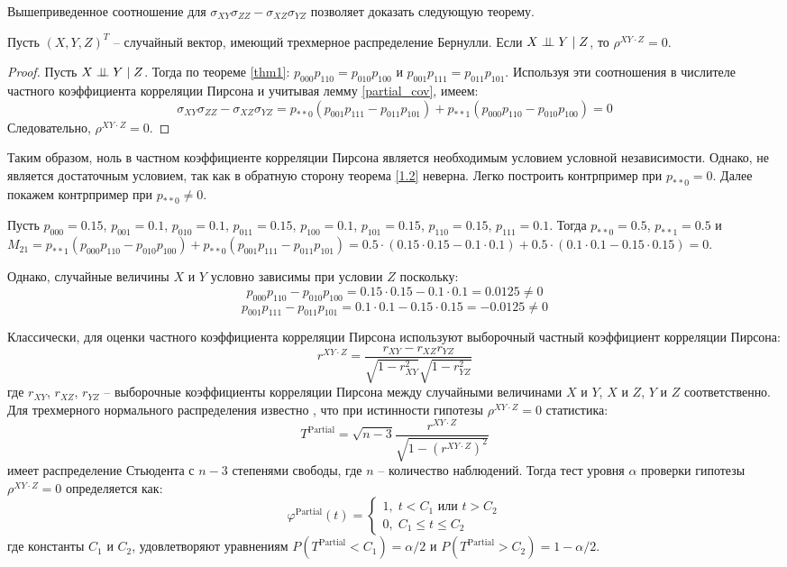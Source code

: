 Вышеприведенное соотношение для $\sigma_{XY} \sigma_{ZZ} - \sigma_{XZ} \sigma_{YZ}$ позволяет доказать следующую теорему.
\begin{theorem}\label{1.2}
    Пусть $(X,Y,Z)^T$ -- случайный вектор, имеющий трехмерное распределение Бернулли.
    Если $X \perp\!\!\!\perp Y \mid Z$, то $\rho^{XY \cdot Z}=0$.
\end{theorem}
\begin{proof}
    Пусть $X \perp\!\!\!\perp Y \mid Z$. Тогда по теореме \ref{thm1}:
    $p_{000}p_{110}=p_{010}p_{100}$ и 
    $p_{001}p_{111}=p_{011}p_{101}$.
    Используя эти соотношения в числителе частного коэффициента корреляции Пирсона и учитывая лемму \ref{partial_cov}, имеем:
    $$
    \sigma_{XY} \sigma_{ZZ} - \sigma_{XZ} \sigma_{YZ}=p_{**0}(p_{001}p_{111}-p_{011}p_{101}) + p_{**1} (p_{000}p_{110}-p_{010}p_{100})= 0
    $$
    Следовательно, $\rho^{XY \cdot Z}=0$.
\end{proof}
Таким образом, ноль в частном коэффициенте корреляции Пирсона является необходимым условием условной независимости.
Однако, не является достаточным условием, так как в обратную сторону теорема \ref{1.2} неверна. Легко построить контрпример при $p_{**0}=0$. Далее покажем контрпример при $p_{**0} \neq 0$.
\begin{example}
    Пусть $p_{000}=0.15$, $p_{001}=0.1$, $p_{010}=0.1$, $p_{011}=0.15$, $p_{100}=0.1$, $p_{101}=0.15$, $p_{110}=0.15$, $p_{111}=0.1$.
    Тогда $p_{**0}=0.5$, $p_{**1}=0.5$ и
    $M_{21} = p_{**1}(p_{000}p_{110}-p_{010}p_{100}) + p_{**0}(p_{001}p_{111}-p_{011}p_{101})= 0.5 \cdot (0.15 \cdot 0.15 - 0.1 \cdot 0.1) + 0.5 \cdot (0.1 \cdot 0.1 - 0.15 \cdot 0.15) = 0$.

    Однако, случайные величины $X$ и $Y$ условно зависимы при условии $Z$ поскольку:
    $$
        p_{000}p_{110}-p_{010}p_{100}=0.15 \cdot 0.15 - 0.1 \cdot 0.1 = 0.0125 \neq 0
    $$
    $$
        p_{001}p_{111}-p_{011}p_{101}=0.1 \cdot 0.1 - 0.15 \cdot 0.15 = -0.0125 \neq 0
    $$
\end{example}

Классически, для оценки частного коэффициента корреляции Пирсона используют выборочный частный коэффициент корреляции Пирсона:
$$r^{XY\cdot Z}=\dfrac{r_{XY}-r_{XZ}r_{YZ}}{\sqrt{1-r_{XY}^2}\sqrt{1-r_{YZ}^2}}$$
где $r_{XY}$, $r_{XZ}$, $r_{YZ}$ -- выборочные коэффициенты корреляции Пирсона
между случайными величинами $X$ и $Y$, $X$ и $Z$, $Y$ и $Z$
соответственно. 
Для трехмерного нормального распределения известно \cite{Anderson2003}, что при истинности гипотезы $\rho^{XY \cdot Z}=0$ статистика:
$$
T^{\text{Partial}}=\sqrt{n-3} \dfrac{r^{XY \cdot Z}}{\sqrt{1-(r^{XY \cdot Z})^2}}
$$
имеет распределение Стьюдента с $n-3$ степенями свободы, 
где $n$ -- количество наблюдений.
Тогда тест уровня $\alpha$ проверки гипотезы $\rho^{XY\cdot Z}=0$ 
определяется как:
$$
\varphi^{\text{Partial}}(t) = \begin{cases}
    1, \; t<C_1 \text{ или } t>C_2 \\ 
    0, \; C_1 \leq t \leq C_2
\end{cases}
$$
где константы $C_1$ и $C_2$, удовлетворяют уравнениям $P(T^{\text{Partial}}<C_1)=\alpha/2$ и 
$P(T^{\text{Partial}}>C_2)=1-\alpha/2$.

